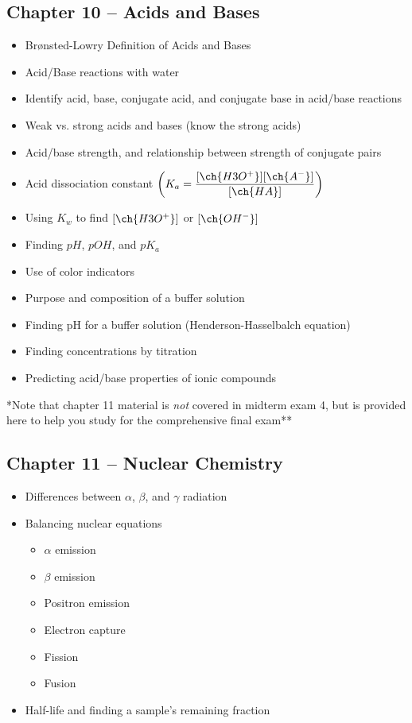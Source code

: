 \documentclass[12pt, letterpaper]{memoir}
\begin{document}
	\subsection*{Chapter 10 --  Acids and Bases}
	\begin{itemize}
		\item Br\o nsted-Lowry Definition of Acids and Bases
		\item Acid/Base reactions with water
		\item Identify acid, base, conjugate acid, and conjugate base in acid/base reactions
		\item Weak vs. strong acids and bases (know the strong acids)
		\item Acid/base strength, and relationship between strength of conjugate pairs
		\item Acid dissociation constant $\left(K_a=\dfrac{[\ch{H3O^+}][\ch{A^-}]}{[\ch{HA}]}\right)$
		\item Using $K_w$ to find $[\ch{H3O^+}]$ or $[\ch{OH^-}]$
		\item Finding $pH$, $pOH$, and $pK_a$
		\item Use of color indicators
		\item Purpose and composition of a buffer solution
		\item Finding pH for a buffer solution (Henderson-Hasselbalch equation)
		\item Finding concentrations by titration
		\item Predicting acid/base properties of ionic compounds
	\end{itemize}

\noindent **Note that chapter 11 material is \emph{not} covered in midterm exam 4, but is provided here to help you study for the comprehensive final exam**

	\subsection*{Chapter 11 --  Nuclear Chemistry}
	\begin{itemize}
		\item Differences between $\alpha$, $\beta$, and $\gamma$ radiation
		\item Balancing nuclear equations
		\begin{itemize}
			\item $\alpha$ emission
			\item $\beta$ emission
			\item Positron emission
			\item Electron capture
			\item Fission
			\item Fusion
		\end{itemize}
		\item Half-life and finding a sample's remaining fraction
	\end{itemize}
\end{document}
